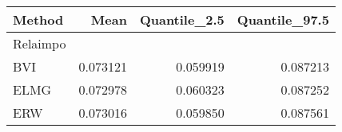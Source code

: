 \begin{table}[ht]
\centering
\begin{tabular}{lrrr}
  \hline
Method & Mean & Quantile\_2.5 & Quantile\_97.5 \\ 
  \hline
Relaimpo &  &  &  \\ 
  BVI & 0.073121 & 0.059919 & 0.087213 \\ 
  ELMG & 0.072978 & 0.060323 & 0.087252 \\ 
  ERW & 0.073016 & 0.059850 & 0.087561 \\ 
   \hline
\end{tabular}
\end{table}
